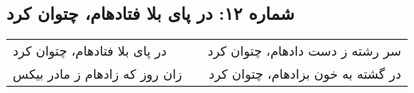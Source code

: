 \begin{center}
\section*{شماره ۱۲: در پای بلا فتادهام، چتوان کرد}
\label{sec:012}
\begin{longtable}{l p{0.5cm} r}
در پای بلا فتادهام، چتوان کرد
&&
سر رشته ز دست دادهام، چتوان کرد
\\
زان روز که زادهام ز مادر بیکس
&&
در گشته به خون بزادهام، چتوان کرد
\\
\end{longtable}
\end{center}

